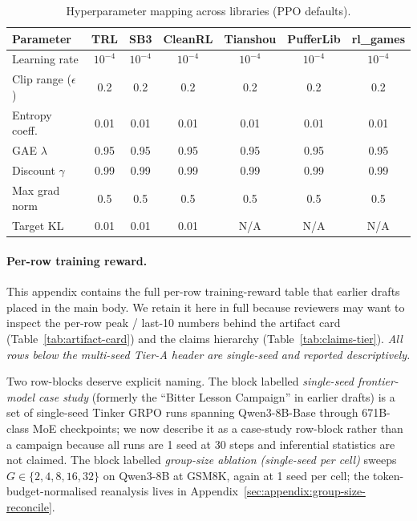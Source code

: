 \begin{table}[ht]
\centering
\caption{Hyperparameter mapping across libraries (PPO defaults).}
\label{tab:hyperparams}
\small
\setlength{\tabcolsep}{4pt}
\begin{tabular}{lcccccc}
\toprule
\textbf{Parameter} & \textbf{TRL} & \textbf{SB3} & \textbf{CleanRL} & \textbf{Tianshou} & \textbf{PufferLib} & \textbf{rl\_games} \\
\midrule
Learning rate & $10^{-4}$ & $10^{-4}$ & $10^{-4}$ & $10^{-4}$ & $10^{-4}$ & $10^{-4}$ \\
Clip range ($\epsilon$) & 0.2 & 0.2 & 0.2 & 0.2 & 0.2 & 0.2 \\
Entropy coeff. & 0.01 & 0.01 & 0.01 & 0.01 & 0.01 & 0.01 \\
GAE $\lambda$ & 0.95 & 0.95 & 0.95 & 0.95 & 0.95 & 0.95 \\
Discount $\gamma$ & 0.99 & 0.99 & 0.99 & 0.99 & 0.99 & 0.99 \\
Max grad norm & 0.5 & 0.5 & 0.5 & 0.5 & 0.5 & 0.5 \\
Target KL & 0.01 & 0.01 & 0.01 & N/A & N/A & N/A \\
\bottomrule
\end{tabular}
\end{table}

\paragraph{Per-row training reward.}
This appendix contains the full per-row training-reward table that earlier
drafts placed in the main body. We retain it here in full because reviewers
may want to inspect the per-row peak / last-10 numbers behind the artifact
card (Table~\ref{tab:artifact-card}) and the claims hierarchy
(Table~\ref{tab:claims-tier}). \emph{All rows below the multi-seed Tier-A
header are single-seed and reported descriptively.}

Two row-blocks deserve explicit naming. The block labelled
\textit{single-seed frontier-model case study} (formerly the ``Bitter
Lesson Campaign'' in earlier drafts) is a set of single-seed Tinker GRPO
runs spanning Qwen3-8B-Base through 671B-class MoE checkpoints; we now
describe it as a case-study row-block rather than a campaign because all
runs are 1 seed at 30 steps and inferential statistics are not claimed.
The block labelled \textit{group-size ablation (single-seed per cell)}
sweeps $G \in \{2,4,8,16,32\}$ on Qwen3-8B at GSM8K, again at 1 seed per
cell; the token-budget-normalised reanalysis lives in
Appendix~\ref{sec:appendix:group-size-reconcile}.


